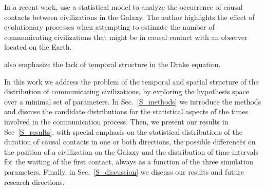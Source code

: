 \documentclass[crop]{CSLB}%
\begin{document}
In a recent work, \citep{Balbi2018} use a statistical model to analyze
the occurrence of causal contacts between civilizations in the Galaxy.
%
The author highlights the effect of evolutionary processes when
attempting to estimate the number of communicating civilizations that
might be in causal contact with an observer located on the Earth.



\citet{cirkovic_temporal_2004} also emphasize the lack of temporal
structure in the Drake equation.






%
%





In this work we address the problem of the temporal and spatial
structure of the distribution of communicating civilizations, by
exploring the hypothesis space over a minimal set of parameters.
%
In Sec.~\ref{S_methods} we introduce the methods and discuss the candidate
distributions for the statistical aspects of the times involved in the
communication process.
%
Then, we present our results in Sec~\ref{S_results}, with special emphasis on
the statistical distributions of the duration of causal contacts in one or
both directions, the possible differences on the position of a
civilization on the Galaxy and the distribution of time intervals for
the waiting of the first contact, always as a function of the three
simulation parameters.
%
Finally, in Sec.~\ref{S_discussion} we discuss our results and future research
directions.
\end{document}

